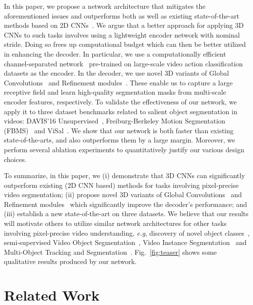 \documentclass{bmvc2k_arxiv}
\makeatletter
\newcommand*{\eg}{\emph{e.g.}\@\xspace}
\def\eg{\emph{e.g}\bmvaOneDot}
\makeatother
\begin{document}
In this paper, we propose a network architecture that mitigates the aforementioned issues and outperforms both \cite{Hou19BMVC} as well as existing state-of-the-art methods based on 2D CNNs~\cite{Jain17CVPR, Tokmakov17ICCV, Yang19ICCVAnchorDiff, Wang19ICCV}. We argue that a better approach for applying 3D CNNs to such tasks involves using a lightweight encoder network with nominal stride. Doing so frees up computational budget which can then be better utilized in enhancing the decoder. In particular, we use a computationally efficient channel-separated network~\cite{Tran19ICCV} pre-trained on large-scale video action classification datasets as the encoder. In the decoder, we use novel 3D variants of Global Convolutions~\cite{Peng17CVPR} and Refinement modules~\cite{Pinheiro16ECCV,Wug18CVPR}. These enable us to capture a large receptive field and learn high-quality segmentation masks from multi-scale encoder features, respectively.
To validate the effectiveness of our network, we apply it to three dataset benchmarks related to salient object segmentation in videos: DAVIS'16 Unsupervised~\cite{Perazzi16CVPR}, Freiburg-Berkeley Motion Segmentation (FBMS)~\cite{Ochs13TPAMI} and ViSal~\cite{Wang15TIP}. We show that our network is both faster than existing state-of-the-arts, and also outperforms them by a large margin. Moreover, we perform several ablation experiments to quantitatively justify our various design choices.

To summarize, in this paper, we (i) demonstrate that 3D CNNs can significantly outperform existing (2D CNN based) methods for tasks involving pixel-precise video segmentation; (ii) propose novel 3D variants of Global Convolutions~\cite{Peng17CVPR} and Refinement modules~\cite{Pinheiro16ECCV,Wug18CVPR} which significantly improve the decoder's performance; and (iii) establish a new state-of-the-art on three datasets.
We believe that our results will motivate others to utilize similar network architectures for other tasks involving pixel-precise video understanding, \eg, discovery of novel object classes~\cite{Xiao16CVPR, Osep19ICRA, Wang14ECCV, Kwak15ICCV}, semi-supervised Video Object Segmentation~\cite{Caelles17CVPR}, Video Instance Segmentation~\cite{Yang19ICCV} and Multi-Object Tracking and Segmentation~\cite{Voigtlaender19CVPR}. 
Fig.~\ref{fig:teaser} shows some qualitative results produced by our network. 
\section{Related Work}
\label{sec:related_work}
\end{document}
